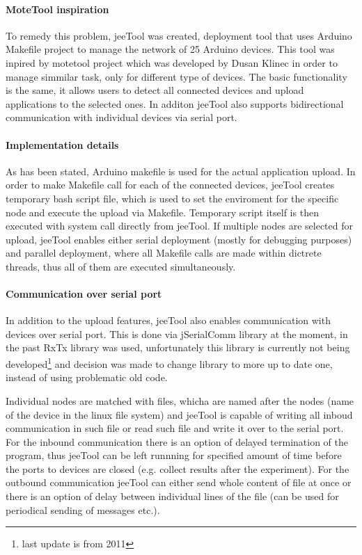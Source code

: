 \documentclass[
  digital, %
  table,   %
  nolof,     %
  nolot,     %
           oneside
]{fithesis3}
\begin{document}
\paragraph{MoteTool inspiration}
  To remedy this problem, jeeTool %
  was created, deployment tool that uses Arduino Makefile project %
  to manage the network of 25 Arduino devices. This tool was inpired by motetool project %
  which was developed by Dusan Klinec in order to manage simmilar task, only for different type of devices. The basic functionality is the same, it allows users to detect all connected devices and upload applications to the selected ones. In additon jeeTool also supports bidirectional communication with individual devices via serial port.

\paragraph{Implementation details}
  As has been stated, Arduino makefile is used for the actual application upload. In order to make Makefile call for each of the connected devices, jeeTool creates temporary bash script file, which is used to set the enviroment for the specific node and execute the upload via Makefile. Temporary script itself is then executed with system call directly from jeeTool. If multiple nodes are selected for upload, jeeTool enables either serial deployment (mostly for debugging purposes) and parallel deployment, where all Makefile calls are made within dictrete threads, thus all of them are executed simultaneously.

\paragraph{Communication over serial port}
  In addition to the upload features, jeeTool also enables communication with devices over serial port. This is done via jSerialComm library %
  at the moment, in the past RxTx library %
  was used, unfortunately this library is currently not being developed\footnote{last update is from 2011} and decision was made to change library to more up to date one, instead of using problematic old code.

  Individual nodes are matched with files, whicha are named after the nodes (name of the device in the linux file system) and jeeTool is capable of writing all inboud communication in such file or read such file and write it over to the serial port. For the inbound communication there is an option of delayed termination of the program, thus jeeTool can be left runnning for specified amount of time before the ports to devices are closed (e.g. collect results after the experiment). For the outbound communication jeeTool can either send whole content of file at once or there is an option of delay between individual lines of the file (can be used for periodical sending of messages etc.).
\end{document}
